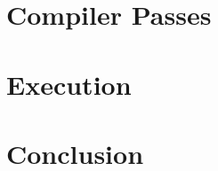 \documentclass[%
draft, %
a4paper,
UKenglish,
cleveref,
autoref,
thm-restate,
pdfa
]{oasics-v2021}
\begin{document}





\section{Compiler Passes}
\label{sec:compiler-pass}



\section{Execution}
\label{sec:semantics}



%
%
%
%

\section{Conclusion}
\label{sec:conclusion}



\newpage


%
%  
%
%  
%
%  
\end{document}
